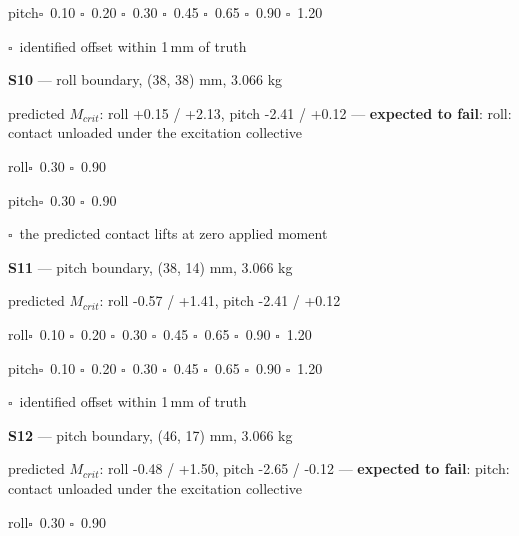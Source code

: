 \documentclass[10pt]{article}
\begin{document}
\hspace*{6mm}pitch\quad $\square$~0.10 \quad $\square$~0.20 \quad $\square$~0.30 \quad $\square$~0.45 \quad $\square$~0.65 \quad $\square$~0.90 \quad $\square$~1.20\par
\hspace*{6mm}$\square$~identified offset within 1\,mm of truth\par\medskip
\textbf{S10} --- roll boundary, (38, 38) mm, 3.066 kg\par
\hspace*{6mm}\footnotesize predicted $M_{crit}$: roll +0.15 / +2.13, pitch -2.41 / +0.12 --- \textbf{expected to fail}: roll: contact unloaded under the excitation collective\normalsize\par
\hspace*{6mm}roll\quad $\square$~0.30 \quad $\square$~0.90\par
\hspace*{6mm}pitch\quad $\square$~0.30 \quad $\square$~0.90\par
\hspace*{6mm}$\square$~the predicted contact lifts at zero applied moment\par\medskip
\textbf{S11} --- pitch boundary, (38, 14) mm, 3.066 kg\par
\hspace*{6mm}\footnotesize predicted $M_{crit}$: roll -0.57 / +1.41, pitch -2.41 / +0.12\normalsize\par
\hspace*{6mm}roll\quad $\square$~0.10 \quad $\square$~0.20 \quad $\square$~0.30 \quad $\square$~0.45 \quad $\square$~0.65 \quad $\square$~0.90 \quad $\square$~1.20\par
\hspace*{6mm}pitch\quad $\square$~0.10 \quad $\square$~0.20 \quad $\square$~0.30 \quad $\square$~0.45 \quad $\square$~0.65 \quad $\square$~0.90 \quad $\square$~1.20\par
\hspace*{6mm}$\square$~identified offset within 1\,mm of truth\par\medskip
\textbf{S12} --- pitch boundary, (46, 17) mm, 3.066 kg\par
\hspace*{6mm}\footnotesize predicted $M_{crit}$: roll -0.48 / +1.50, pitch -2.65 / -0.12 --- \textbf{expected to fail}: pitch: contact unloaded under the excitation collective\normalsize\par
\hspace*{6mm}roll\quad $\square$~0.30 \quad $\square$~0.90\par
\end{document}
